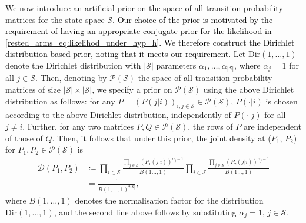 We now introduce an artificial prior on the space of all transition probability matrices for the state space $\mathcal{S}$. \textcolor{black}{Our choice of the prior is motivated by the requirement of having an appropriate conjugate prior for the likelihood in \eqref{rested_arms_eq:likelihod_under_hyp_h}. We therefore construct the Dirichlet distribution-based prior, noting that it meets our requirement.} Let $\text{Dir}(1,\ldots,1)$ denote the Dirichlet distribution with $|\mathcal{S}|$ parameters $\alpha_1,\ldots,\alpha_{|\mathcal{S}|}$, where $\alpha_j=1$ for all $j\in\mathcal{S}$. Then, denoting by $\mathscr{P}(\mathcal{S})$ the space of all transition probability matrices of size $|\mathcal{S}|\times |\mathcal{S}|$, we specify a prior on $\mathscr{P}(\mathcal{S})$ using the above Dirichlet distribution as follows: for any $P=(P(j|i))_{i,j\in\mathcal{S}}\in \mathscr{P}(\mathcal{S})$, $P(\cdot|i)$ is chosen according to the above Dirichlet distribution, independently of $P(\cdot|j)$ for all $j\neq i$. Further, for any two matrices $P,Q\in\mathscr{P}(\mathcal{S})$, the rows of $P$ are independent of those of $Q$. Then, it follows that under this prior, the joint density at ($P_1$, $P_2$) for $P_1,P_2\in\mathscr{P}(\mathcal{S})$  is
\begingroup\allowdisplaybreaks\begin{align}
	\mathscr{D}(P_1,P_2)&\coloneqq\prod\limits_{i\in\mathcal{S}}\frac{\prod\limits_{j\in\mathcal{S}}(P_1(j|i))^{\alpha_j-1}}{B(1\ldots,1)}\prod\limits_{i\in\mathcal{S}}\frac{\prod\limits_{j\in\mathcal{S}}(P_2(j|i))^{\alpha_j-1}}{B(1\ldots,1)}\nonumber\\
	&=\frac{1}{B(1,\ldots,1)^{2|\mathcal{S}|}}\label{rested_arms_eq:Dirichlet_prior},
\end{align}\endgroup
where $B(1,\ldots,1)$ denotes the normalisation factor for the distribution $\text{Dir}(1,\ldots,1)$, and the second line above follows by substituting $\alpha_j=1$, $j\in\mathcal{S}$.
